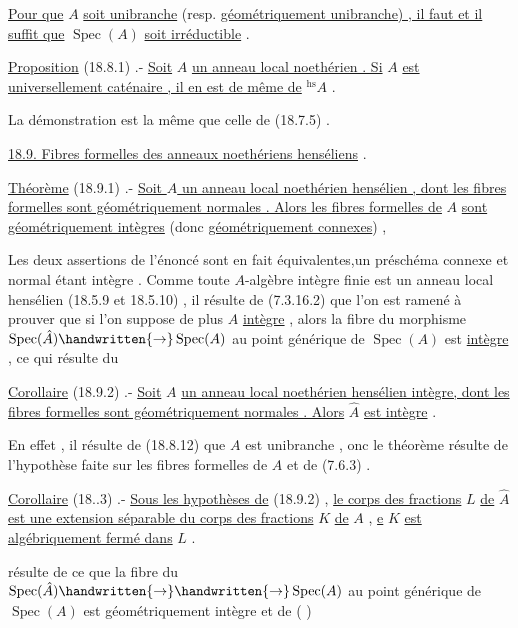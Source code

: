
\uline{Pour que} $A$ \uline{soit unibranche} (resp. \uline{géométriquement unibranche) , il faut et il suffit que} $\operatorname{Spec}(A)$ \uline{soit irréductible} .

\uline{Proposition} (18.8.1) .- \uline{Soit} $A$ \uline{un anneau local noethérien . Si} $A$ \uline{est universellement caténaire , il en est de même de} $ {}^{\mathrm{hs}}A$ .

La démonstration est la même que celle de (18.7.5) .

\uline{18.9. Fibres formelles des anneaux noethériens henséliens} .

\uline{Théorème} (18.9.1) .- \uline{Soit $A$ un anneau local noethérien hensélien , dont les fibres formelles sont géométriquement normales . Alors les fibres formelles de} $A$ \uline{sont géométriquement intègres} (donc \uline{géométriquement connexes}) ,

Les deux assertions de l'énoncé sont en fait équivalentes,un préschéma  connexe et normal étant intègre . Comme toute $A$-algèbre intègre finie est un anneau local hensélien (18.5.9 et 18.5.10) , il résulte de (7.3.16.2) que l'on est ramené à prouver que si l'on suppose de plus $A$ \uline{intègre} , alors la fibre du morphisme $\operatorname{Spec}(\hat A)\handwritten{\to}\operatorname{Spec}(A)$ au point générique de $\operatorname{Spec}(A)$ est \uline{intègre} , ce qui résulte du

\uline{Corollaire} (18.9.2) .- \uline{Soit} $A$ \uline{un anneau local noethérien hensélien intègre, dont les fibres formelles sont géométriquement normales . Alors} $\hat A$ \uline{est intè}\uline{gre} .

En effet , il résulte de (18.8.12) que $A$ est unibranche , onc  le théorème résulte de l'hypothèse faite sur les fibres formelles de $A$ et de (7.6.3) .

\uline{Corollaire} (18..3) .- \uline{Sous les hypothèses de} (18.9.2) , \uline{le corps des fractions} $L$ \uline{de} $\hat A$ \uline{est une extension séparable du corps des fractions} $K$ \uline{de} $A$ , \uline{e} $K$ \uline{est algébriquement fermé dans} $L$ .

   résulte de ce que la fibre du  $\operatorname{Spec}(\hat A)\handwritten{\to}\handwritten{\to}\operatorname{Spec}(A)$ au point générique de $\operatorname{Spec}(A)$ est géométriquement  intègre et de ( ) 
